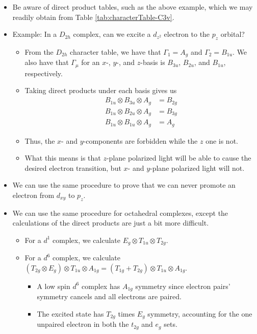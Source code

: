\documentclass[../notes.tex]{subfiles}
\begin{document}
\begin{itemize}
    \item Be aware of direct product tables, such as the above example, which we may readily obtain from Table \ref{tab:characterTable-C3v}.
    \item Example: In a $D_{2h}$ complex, can we excite a $d_{z^2}$ electron to the $p_z$ orbital?
    \begin{itemize}
        \item From the $D_{2h}$ character table, we have that $\Gamma_1=A_g$ and $\Gamma_2=B_{1u}$. We also have that $\Gamma_\mu$ for an $x$-, $y$-, and $z$-basis is $B_{3u}$, $B_{2u}$, and $B_{1u}$, respectively.
        \item Taking direct products under each basis gives us
        \begin{align*}
            B_{1u}\otimes B_{3u}\otimes A_g &= B_{2g}\tag{$x$-basis}\\
            B_{1u}\otimes B_{2u}\otimes A_g &= B_{3g}\tag{$y$-basis}\\
            B_{1u}\otimes B_{1u}\otimes A_g &= A_g\tag{$z$-basis}
        \end{align*}
        \item Thus, the $x$- and $y$-components are forbidden while the $z$ one is not.
        \item What this means is that $z$-plane polarized light will be able to cause the desired electron transition, but $x$- and $y$-plane polarized light will not.
    \end{itemize}
    \item We can use the same procedure to prove that we can never promote an electron from $d_{xy}$ to $p_z$.
    \item We can use the same procedure for octahedral complexes, except the calculations of the direct products are just a bit more difficult.
    \begin{itemize}
        \item For a $d^1$ complex, we calculate $E_g\otimes T_{1u}\otimes T_{2g}$.
        \item For a $d^6$ complex, we calculate $(T_{2g}\otimes E_g)\otimes T_{1u}\otimes A_{1g}=(T_{1g}+T_{2g})\otimes T_{1u}\otimes A_{1g}$.
        \begin{itemize}
            \item A low spin $d^6$ complex has $A_{1g}$ symmetry since electron pairs' symmetry cancels and all electrons are paired.
            \item The excited state has $T_{2g}$ times $E_g$ symmetry, accounting for the one unpaired electron in both the $t_{2g}$ and $e_g$ sets.
        \end{itemize}
    \end{itemize}
\end{itemize}
\end{document}
